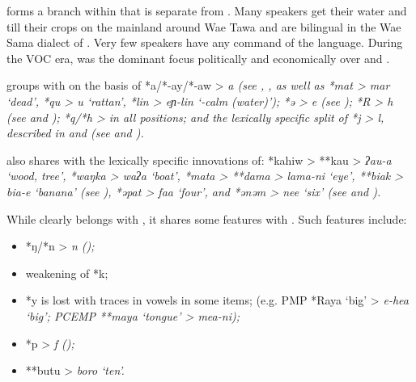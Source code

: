  forms a branch within  that is separate from .
Many  speakers get their water
and till their crops on the  mainland around Wae Tawa
and are bilingual in the Wae Sama dialect of .
Very few  speakers have any command of the  language.
During the VOC era,
 was the dominant focus politically
and economically over  and .

 groups with  on the basis of *a/*-ay/*-aw
> \it{a} (see , , as well as
*mat > \it{mar} ‘dead’,
*qu > \it{u} ‘rattan’,
*lin > \it{eɲ-lin} ‘-calm (water)’);
*ə > \it{e}
(see ); *R > \it{h} (see 
and ); *q/*h > {\0} in all positions;
and the lexically specific split of *j > \it{l},
{\0} described in 
and  (see  and ).

 also shares with  the lexically specific
innovations of: *kahiw > **kau > \it{ʔau-a} ‘wood,
tree’, *waŋka > \it{waʔa} ‘boat’,
*mata > **dama > \it{lama-ni} ‘eye’,
**biak > \it{bia-e} ‘banana’ (see ),
*əpat > \it{faa} ‘four’,
and *ənəm > \it{nee} ‘six’ (see  and ).

While  clearly belongs with ,
it shares some features with .
Such features include: 

\begin{itemize}
	\item	*ŋ/*n > \it{n} ();
	\item	weakening of *k;
	\item	*y is lost with traces in vowels in some items;
				(e.g. PMP *Raya ‘big’ > \it{e-hea} ‘big’;
				PCEMP **maya ‘tongue’ > \it{mea-ni});
	\item	*p > \it{f} ();
	\item	**butu > \it{boro} ‘ten’.
\end{itemize}

